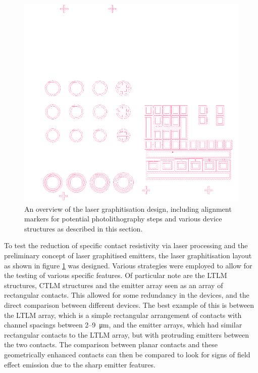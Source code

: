 \begin{refsection}
\begin{figure}[H]
    \centering
    \includegraphics[width=\textwidth]{Chapter7/Figs/Raster/overview of design.png}
    \caption{An overview of the laser graphitisation design, including alignment markers for potential photolithography steps and various device structures as described in this section.}
    \label{fig:design_overview}
\end{figure}

To test the reduction of specific contact resistivity via laser processing and the preliminary concept of laser graphitised emitters, the laser graphitisation layout as shown in figure \ref{fig:design_overview} was designed. Various strategies were employed to allow for the testing of various specific features. Of particular note are the LTLM structures, CTLM structures and the emitter array seen as an array of rectangular contacts. This allowed for some redundancy in the devices, and the direct comparison between different devices. The best example of this is between the LTLM array, which is a simple rectangular arrangement of contacts with channel spacings between 2--9~\si{\micro\metre}, and the emitter arrays, which had similar rectangular contacts to the LTLM array, but with protruding emitters between the two contacts. The comparison between planar contacts and these geometrically enhanced contacts can then be compared to look for signs of field effect emission due to the sharp emitter features.


\end{refsection}
